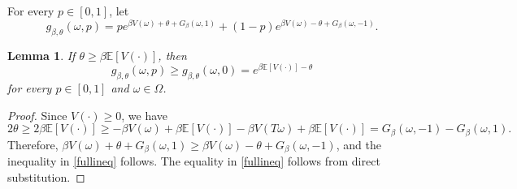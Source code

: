 \documentclass[a4paper]{amsart}
\numberwithin{equation}{section}
\theoremstyle{plain}
\newtheorem{lemma}[theorem]{\sc Lemma}
\theoremstyle{remark}
\begin{document}
For every $p\in[0,1]$, let
$$g_{\beta,\theta}(\omega,p) = pe^{\beta V(\omega) + \theta + G_\beta(\omega,1)} + (1-p)e^{\beta V(\omega) - \theta + G_\beta(\omega,-1)}.$$

\begin{lemma}\label{cokgenold}
If $\theta\ge\beta\mathbb{E}[V(\cdot)]$, then
\begin{equation}\label{fullineq}
g_{\beta,\theta}(\omega,p) \ge g_{\beta,\theta}(\omega,0) = e^{\beta\mathbb{E}[V(\cdot)] - \theta}
\end{equation}
for every $p\in[0,1]$ and $\omega\in\Omega$.
\end{lemma}

\begin{proof}
Since $V(\cdot)\ge0$, we have
$$2\theta \ge 2\beta\mathbb{E}[V(\cdot)] \ge -\beta V(\omega) + \beta\mathbb{E}[V(\cdot)] -\beta V(T\omega) + \beta\mathbb{E}[V(\cdot)] = G_\beta(\omega,-1) - G_\beta(\omega,1).$$
Therefore, $\beta V(\omega) + \theta + G_\beta(\omega,1) \ge \beta V(\omega) - \theta + G_\beta(\omega,-1)$, and the inequality in \eqref{fullineq} follows.
The equality in \eqref{fullineq} follows from direct substitution.
\end{proof}
\end{document}
